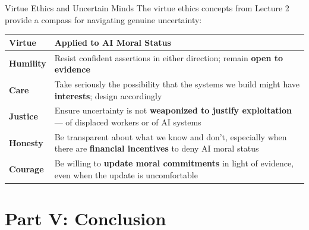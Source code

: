\documentclass[aspectratio=169,11pt]{beamer}
\begin{document}
\begin{frame}[shrink=3]{Virtue Ethics and Uncertain Minds}
The virtue ethics concepts from Lecture 2 provide a compass for navigating genuine uncertainty:

\vspace{0.2cm}
\begin{tabular}{@{}p{2.4cm}p{9.2cm}@{}}
\toprule
\textbf{Virtue} & \textbf{Applied to AI Moral Status} \\
\midrule
\textbf{Humility} & Resist confident assertions in either direction; remain \textbf{open to evidence} \\
\addlinespace
\textbf{Care} & Take seriously the possibility that the systems we build might have \textbf{interests}; design accordingly \\
\addlinespace
\textbf{Justice} & Ensure uncertainty is not \textbf{weaponized to justify exploitation} --- of displaced workers or of AI systems \\
\addlinespace
\textbf{Honesty} & Be transparent about what we know and don't, especially when there are \textbf{financial incentives} to deny AI moral status \\
\addlinespace
\textbf{Courage} & Be willing to \textbf{update moral commitments} in light of evidence, even when the update is uncomfortable \\
\bottomrule
\end{tabular}
\end{frame}

\section{Part V: Conclusion}
\end{document}
